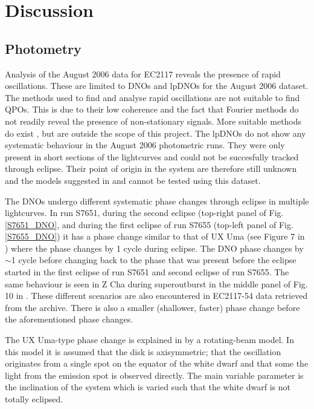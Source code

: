\chapter{Discussion}

\section{Photometry}
\label{photo_discussion}

Analysis of the August 2006 data for EC2117 reveals the presence of rapid oscillations. These are limited to DNOs and lpDNOs for the August 2006 dataset. The methods used to find and analyse rapid oscillations are not suitable to find QPOs. This is due to their low coherence and the fact that Fourier methods do not readily reveal the presence of non-stationary signals. More suitable methods do exist \citep{blackman}, but are outside the scope of this project. The lpDNOs do not show any systematic behaviour in the August 2006 photometric runs. They were only present in short sections of the lightcurves and could not be succesfully tracked through eclipse. Their point of origin in the system are therefore still unknown and the models suggested in \cite{DNOQPO_II} and \cite{DNOQPO_VI} cannot be tested using this dataset. 

The DNOs undergo different systematic phase changes through eclipse in multiple lightcurves. In run S7651, during the second eclipse (top-right panel of Fig. \ref{S7651_DNO}, and during the first eclipse of run S7655 (top-left panel of Fig. \ref{S7655_DNO}) it has a phase change similar to that of UX Uma (see Figure 7 in \cite{1980ApJ...241..247P}) where the phase changes by 1 cycle during eclipse. The DNO phase changes by $\sim$1 cycle before changing back to the phase that was present before the eclipse started in the first eclipse of run S7651 and second eclipse of run S7655. The same behaviour is seen in Z Cha during superoutburst in the middle panel of Fig. 10 in \cite{warner_brickhill}. These different scenarios are also encountered in EC2117-54 data retrieved from the archive.  There is also a smaller (shallower, faster) phase change before the aforementioned phase changes. 

The UX Uma-type phase change is explained in \cite{1980ApJ...241..247P} by a rotating-beam model. In this model it is assumed that the disk is axisymmetric; that the oscillation originates from a single spot on the equator of the white dwarf and that some the light from the emission spot is observed directly. The main variable parameter is the inclination of the system which is varied such that the white dwarf is not totally eclipsed. 

